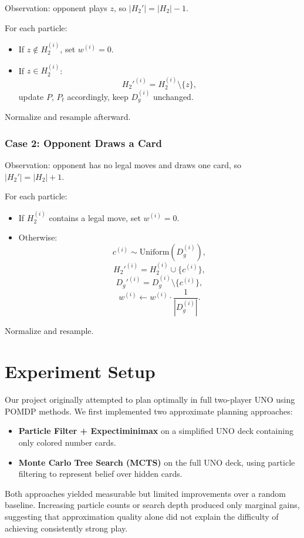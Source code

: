 \documentclass[journal,transmag]{IEEEtran}
\begin{document}
Observation: opponent plays $z$, so $|H_2'| = |H_2| - 1$.

For each particle:
\begin{itemize}
    \item If $z \notin H_2^{(i)}$, set $w^{(i)} = 0$.
    \item If $z \in H_2^{(i)}$:
    \[
    H_2'^{(i)} = H_2^{(i)} \setminus \{z\},
    \]
    update $P$, $P_t$ accordingly, keep $D_g^{(i)}$ unchanged.
\end{itemize}

Normalize and resample afterward.

\subsubsection{Case 2: Opponent Draws a Card}

Observation: opponent has no legal moves and draws one card, so  
$|H_2'| = |H_2| + 1$.

For each particle:
\begin{itemize}
    \item If $H_2^{(i)}$ contains a legal move, set $w^{(i)} = 0$.
    \item Otherwise:
    \[
    c^{(i)} \sim \text{Uniform}(D_g^{(i)}),
    \]
    \[
    H_2'^{(i)} = H_2^{(i)} \cup \{c^{(i)}\},
    \]
    \[
    D_g'^{(i)} = D_g^{(i)} \setminus \{c^{(i)}\},
    \]
    \[
    w^{(i)} \leftarrow w^{(i)} \cdot \frac{1}{|D_g^{(i)}|}.
    \]
\end{itemize}

Normalize and resample.

\section{Experiment Setup}


Our project originally attempted to plan optimally in full two-player
UNO using POMDP methods. We first implemented two approximate planning
approaches:

\begin{itemize}
    \item \textbf{Particle Filter + Expectiminimax} on a simplified UNO
          deck containing only colored number cards.
    \item \textbf{Monte Carlo Tree Search (MCTS)} on the full UNO deck,
          using particle filtering to represent belief over hidden cards.
\end{itemize}

Both approaches yielded measurable but limited improvements over a
random baseline. Increasing particle counts or search depth produced
only marginal gains, suggesting that approximation quality alone did not
explain the difficulty of achieving consistently strong play.
\end{document}
